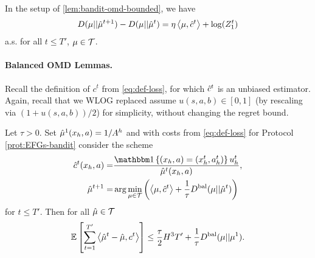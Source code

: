 \begin{lemma}\label{lem:KL-diff-bandit}
    In the setup of \cref{lem:bandit-omd-bounded}, we have 
    \begin{align*}
        D(\mu||\hat{\mu}^{t+1})-D(\mu||\hat{\mu}^t)=\eta\left\langle \mu, \hat{c}^t \right\rangle+\log(Z_1^t)
    \end{align*}
    a.s. for all $t\leq T'$, $\mu\in\mathcal{T}$.
\end{lemma}

\paragraph{Balanced OMD Lemmas.}

\noindent Recall the definition of $c^t$ from \cref{eq:def-loss}, for which $\hat{c}^t$ is an unbiased estimator. Again, recall that we WLOG replaced assume $u(s,a,b)\in[0,1]$ (by rescaling via $(1+u(s,a,b))/2$) for simplicity, without changing the regret bound. 

\begin{lemma} \label{lem:regret-to-init}
    Let $\tau >0$. Set $\hat{\mu}^1(x_h,a) = 1/A^h$ and with costs from \cref{eq:def-loss} for Protocol \ref{prot:EFGs-bandit} consider the scheme 
    \begin{align*}
        \cHat^t(x_h,a) =& \frac{\indicator{(x_h,a)=(x_h^t,a_h^t)}u_h^t}{\muHat^t(x_h,a)},\\
        \muHat^{t+1} =& \arg\min_{\mu \in \Tcal} \round{\inner{\mu}{\cHat^t} + \frac{1}{\tau} \Dbal(\mu || \muHat^t)}
    \end{align*}
    for $t\leq T'$. Then for all $\hat{\mu}\in\mathcal{T}$
    \begin{align*}
        \mathbb{E}\left[ \sum_{t=1}^{T'} \left\langle \hat{\mu}^t-\hat{\mu}, c^t \right\rangle \right] \leq \frac{\tau}{2} H^3T' + \frac{1}{\tau} D^{\text{bal}}(\mu || \mu^1).
    \end{align*}
\end{lemma}

